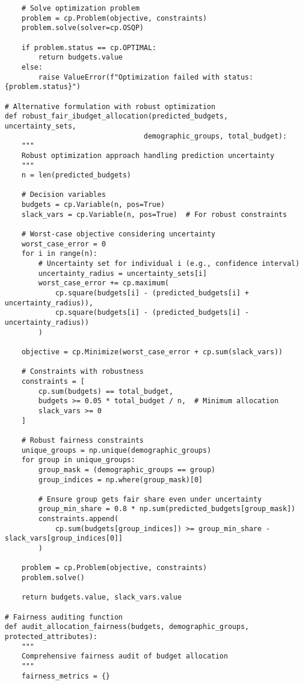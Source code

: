\documentclass[12pt]{article}
\begin{document}
\begin{lstlisting}
    # Solve optimization problem
    problem = cp.Problem(objective, constraints)
    problem.solve(solver=cp.OSQP)
    
    if problem.status == cp.OPTIMAL:
        return budgets.value
    else:
        raise ValueError(f"Optimization failed with status: {problem.status}")

# Alternative formulation with robust optimization
def robust_fair_ibudget_allocation(predicted_budgets, uncertainty_sets, 
                                 demographic_groups, total_budget):
    """
    Robust optimization approach handling prediction uncertainty
    """
    n = len(predicted_budgets)
    
    # Decision variables
    budgets = cp.Variable(n, pos=True)
    slack_vars = cp.Variable(n, pos=True)  # For robust constraints
    
    # Worst-case objective considering uncertainty
    worst_case_error = 0
    for i in range(n):
        # Uncertainty set for individual i (e.g., confidence interval)
        uncertainty_radius = uncertainty_sets[i]
        worst_case_error += cp.maximum(
            cp.square(budgets[i] - (predicted_budgets[i] + uncertainty_radius)),
            cp.square(budgets[i] - (predicted_budgets[i] - uncertainty_radius))
        )
    
    objective = cp.Minimize(worst_case_error + cp.sum(slack_vars))
    
    # Constraints with robustness
    constraints = [
        cp.sum(budgets) == total_budget,
        budgets >= 0.05 * total_budget / n,  # Minimum allocation
        slack_vars >= 0
    ]
    
    # Robust fairness constraints
    unique_groups = np.unique(demographic_groups)
    for group in unique_groups:
        group_mask = (demographic_groups == group)
        group_indices = np.where(group_mask)[0]
        
        # Ensure group gets fair share even under uncertainty
        group_min_share = 0.8 * np.sum(predicted_budgets[group_mask])
        constraints.append(
            cp.sum(budgets[group_indices]) >= group_min_share - slack_vars[group_indices[0]]
        )
    
    problem = cp.Problem(objective, constraints)
    problem.solve()
    
    return budgets.value, slack_vars.value

# Fairness auditing function
def audit_allocation_fairness(budgets, demographic_groups, protected_attributes):
    """
    Comprehensive fairness audit of budget allocation
    """
    fairness_metrics = {}
    

\end{lstlisting}
\end{document}
